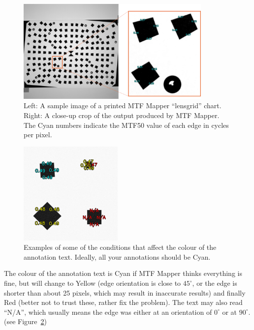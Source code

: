 \documentclass[a4paper]{article}
\begin{document}
\begin{figure}[!ht]
\centering
\includegraphics[width=0.85\textwidth]{figures/annotation_example}
\caption{Left: A sample image of a printed MTF Mapper ``lensgrid'' chart.
Right: A close-up crop of the output produced by MTF Mapper. The Cyan
numbers indicate the MTF50 value of each edge in cycles per pixel.}
\label{fig:annotated_example}
\end{figure}

\begin{figure}[!ht]
\centering
\includegraphics[width=0.45\textwidth]{figures/annotation_colours}
\caption{Examples of some of the conditions that affect the colour of the
annotation text. Ideally, all your annotations should be Cyan.}
\label{fig:annotated_colours}
\end{figure}

The colour of the annotation text is Cyan if MTF Mapper thinks everything is
fine, but will change to Yellow (edge orientation is close to $45^\circ$, or the edge is
shorter than about 25 pixels, which may result in inaccurate results) and
finally Red (better not to trust these, rather fix the problem). The text
may also read ``N/A'', which usually means the edge was either at an
orientation of $0^\circ$ or at $90^\circ$. (see
Figure~\ref{fig:annotated_colours})

\newpage
\end{document}
